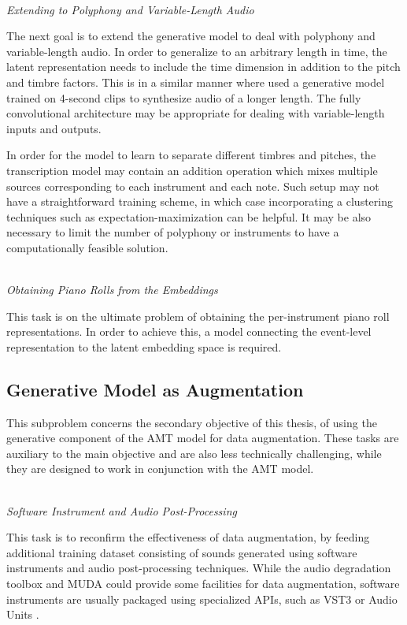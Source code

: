 \mbox{}\\\noindent\emph{Extending to Polyphony and Variable-Length Audio}\mbox{}

The next goal is to extend the generative model to deal with polyphony and variable-length audio.
In order to generalize to an arbitrary length in time, the latent representation needs to include the time dimension in addition to the pitch and timbre factors.
This is in a similar manner where  used a generative model trained on 4-second clips to synthesize audio of a longer length.
The fully convolutional architecture \cite{shelhamer2017fcn} may be appropriate for dealing with variable-length inputs and outputs.

In order for the model to learn to separate different timbres and pitches, the transcription model may contain an addition operation which mixes multiple sources corresponding to each instrument and each note.
Such setup may not have a straightforward training scheme, in which case incorporating a clustering techniques such as expectation-maximization can be helpful.
It may be also necessary to limit the number of polyphony or instruments to have a computationally feasible solution.

\mbox{}\\\noindent\emph{Obtaining Piano Rolls from the Embeddings}\mbox{}

This task is on the ultimate problem of obtaining the per-instrument piano roll representations.
In order to achieve this, a model connecting the event-level representation to the latent embedding space is required.

\subsection{Generative Model as Augmentation}

This subproblem concerns the secondary objective of this thesis, of using the generative component of the AMT model for data augmentation.
These tasks are auxiliary to the main objective and are also less technically challenging, while they are designed to work in conjunction with the AMT model.

\mbox{}\\\noindent\emph{Software Instrument and Audio Post-Processing}\mbox{}

This task is to reconfirm the effectiveness of data augmentation, by feeding additional training dataset consisting of sounds generated using software instruments and audio post-processing techniques.
While the audio degradation toolbox \cite{mauch2013adt} and MUDA \cite{mcfee2015muda} could provide some facilities for data augmentation, software instruments are usually packaged using specialized APIs, such as VST3 or Audio Units \cite{pirkle2014synthesizer}.

